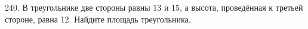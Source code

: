 240. В треугольнике две стороны равны 13 и 15, а высота, проведённая к третьей стороне, равна 12. Найдите площадь треугольника.\\
